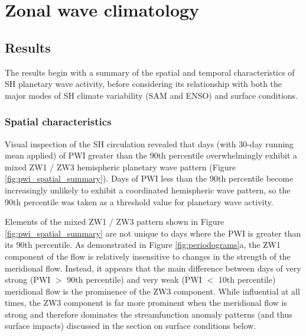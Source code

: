 
\chapter{Zonal wave climatology}



\section{Results}


The results begin with a summary of the spatial and temporal characteristics of SH planetary wave activity, before considering its relationship with both the major modes of SH climate variability (SAM and ENSO) and surface conditions. 


\subsection{Spatial characteristics}\label{s:spatial_characteristics}

Visual inspection of the SH circulation revealed that days (with 30-day running mean applied) of PWI greater than the 90th percentile overwhelmingly exhibit a mixed ZW1 / ZW3 hemispheric planetary wave pattern (Figure \ref{fig:pwi_spatial_summary}). Days of PWI less than the 90th percentile become increasingly unlikely to exhibit a coordinated hemispheric wave pattern, so the 90th percentile was taken as a threshold value for planetary wave activity. 

Elements of the mixed ZW1 / ZW3 pattern shown in Figure \ref{fig:pwi_spatial_summary} are not unique to days where the PWI is greater than its 90th percentile. As demonstrated in Figure \ref{fig:periodograms}a, the ZW1 component of the flow is relatively insensitive to changes in the strength of the meridional flow. Instead, it appears that the main difference between days of very strong (PWI $>$ 90th percentile) and very weak (PWI $<$ 10th percentile) meridional flow is the prominence of the ZW3 component. While influential at all times, the ZW3 component is far more prominent when the meridional flow is strong and therefore dominates the streamfunction anomaly patterns (and thus surface impacts) discussed in the section on surface conditions below. 


